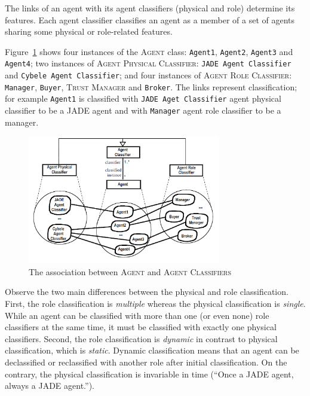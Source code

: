 The links of an agent with its agent classifiers (physical and role) determine its features.
Each agent classifier classifies an agent as a member of a set of agents sharing some physical or role-related features.

Figure~\ref{figure:onp-agent-agent-classifier-association} shows four instances of the \textsc{Agent} class: \texttt{Agent1}, \texttt{Agent2}, \texttt{Agent3} and \texttt{Agent4}; two instances of \textsc{Agent Physical Classifier}: \texttt{JADE Agent Classifier} and \texttt{Cybele Agent Classifier}; and four instances of \textsc{Agent Role Classifier}: \texttt{Manager}, \texttt{Buyer}, \textsc{Trust Manager} and \texttt{Broker}.
The links represent classification; for example \texttt{Agent1} is classified with \texttt{JADE Aget Classifier} agent physical classifier to be a JADE agent and with \texttt{Manager} agent role classifier to be a manager. 

\begin{figure}[ht]
	\centering
	\includegraphics[width=0.75\textwidth]{images/onp/agent-agent-classifier-association.png}
	\caption{The association between \textsc{Agent} and \textsc{Agent Classifiers}}
	\label{figure:onp-agent-agent-classifier-association}
\end{figure}

Observe the two main differences between the physical and role classification. First, the role classification is \textit{multiple} whereas the physical classification is \textit{single}.
While an agent can be classified with more than one (or even none) role classifiers at the same time, it must be classified with exactly one physical classifiers.
Second, the role classification is \textit{dynamic} in contrast to physical classification, which is \textit{static}.
Dynamic classification means that an agent can be declassified or reclassified with another role after initial classification. On the contrary, the physical classification is invariable in time
(``Once a JADE agent, always a JADE agent.'').

